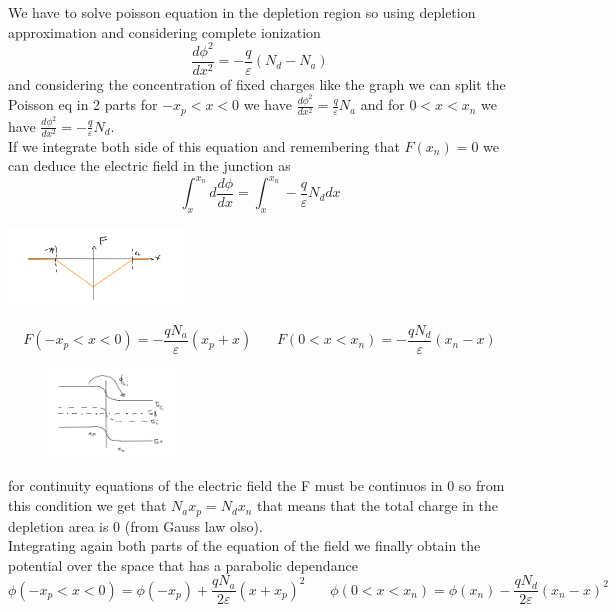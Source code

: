 We have to solve poisson equation in the depletion region so using depletion approximation and considering complete ionization
\begin{equation}
\frac{d\phi^2}{dx^2}=-\frac{q}{\varepsilon}(N_d-N_a)
\end{equation} 
and considering the concentration of fixed charges like the graph we can split the Poisson eq in 2 parts for $-x_p<x<0$ we have $\frac{d\phi^2}{dx^2}=\frac{q}{\varepsilon}N_a$ and for $0<x<x_n$ we have $\frac{d\phi^2}{dx^2}=-\frac{q}{\varepsilon}N_d$.\\
If we integrate both side of this equation and remembering that $F(x_n)=0$ we can deduce the electric field in the junction as 
\begin{equation}
\int^{x_n}_{x} d\frac{d\phi}{dx}=\int^{x_n}_{x}-\frac{q}{\varepsilon}N_d dx
\end{equation}

\centering
\includegraphics[width=0.35\textwidth]{pn4.png}\\
\raggedright

\begin{equation}
F(-x_p<x<0)=-\frac{qN_a}{\varepsilon}(x_p+x)\ \ \ \ \ \ \ \ F(0<x<x_n)=-\frac{qN_d}{\varepsilon}(x_n-x)
\end{equation}

\begin{figure}
\includegraphics[width=0.3\textwidth]{pn5.png}
\end{figure}

for continuity equations of the electric field the F must be continuos in 0 so from this condition we get that $N_ax_p=N_dx_n$ that means that the total charge in the depletion area is 0 (from Gauss law olso).\\
Integrating again both parts of the equation of the field we finally obtain the potential over the space that has a parabolic dependance
\begin{equation}
\phi(-x_p<x<0)=\phi(-x_p)+\frac{qN_a}{2\varepsilon}(x+x_p)^2 \ \ \ \ \ \ \ \ \phi(0<x<x_n)=\phi(x_n)-\frac{qN_d}{2\varepsilon}(x_n-x)^2
\end{equation}



